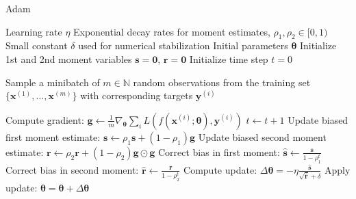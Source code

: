 \documentclass[./main.tex]{subfiles}
\begin{document}
\begin{algorithm}[htbp]
    \caption{Adam \cite{DL_book}}
    \label{Algorithm:ADAM}
    \begin{algorithmic}
        \Require Learning rate $\eta$
        \Require Exponential decay rates for moment estimates, $\rho_1, \rho_2 \in [0, 1)$
        \Require Small constant $\delta$ used for numerical stabilization
        \Require Initial parameters $\bm{\theta}$
        \State Initialize 1st and 2nd moment variables $\bm{s} = \bm{0}$, $\bm{r} = \bm{0}$
        \State Initialize time step $t = 0$

            \State \begin{varwidth}[t]{\linewidth} Sample a minibatch of $m \in \mathbb{N}$ random observations from the training set $\{\bm{x}^{(1)}, ..., \bm{x}^{(m)}\}$ with corresponding targets $\bm{y}^{(i)}$
            \end{varwidth}
            \State Compute gradient: $\bm{g}  \leftarrow  \frac{1}{m} \nabla_{\bm{\theta}} \sum_i L\left( f \left(\bm{x}^{(i)}; \bm{\theta} \right), \bm{y}^{(i)} \right)$
            \State $t \leftarrow t + 1$
            \State Update biased first moment estimate: $\bm{s} \leftarrow \rho_1 \bm{s} + (1 - \rho_1) \bm{g}$
            \State Update biased second moment estimate: $\bm{r} \leftarrow \rho_2 \bm{r} + (1 - \rho_2) \bm{g} \odot \bm{g}$
            \State Correct bias in first moment: $\hat{\bm{s}} \leftarrow \frac{\bm{s}}{1 - \rho_1 ^t}$
            \State Correct bias in second moment: $\hat{\bm{r}} \leftarrow \frac{\bm{r}}{1 - \rho_2 ^t}$
            \State Compute update: $\Delta \bm{\theta} = - \eta \frac{\hat{\bm{s}}}{\sqrt{\hat{\bm{r}}} + \delta}$
            \State Apply update: $\bm{\theta} = \bm{\theta} + \Delta \bm{\theta}$ 
        \EndWhile
    \end{algorithmic}
\end{algorithm}
\end{document}
